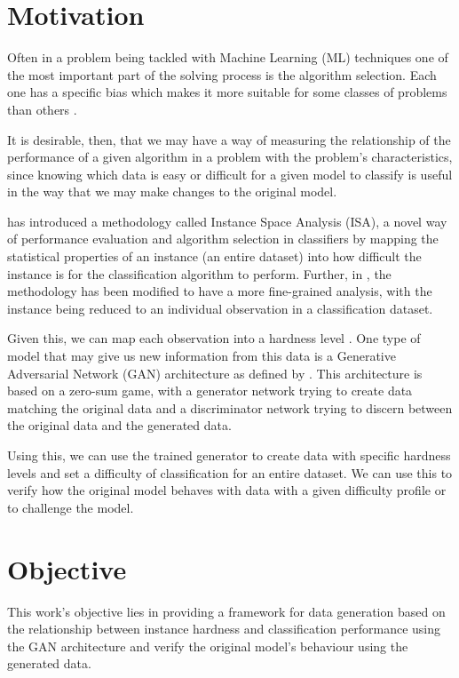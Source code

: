 \section{Motivation}
Often in a problem being tackled with Machine Learning (ML) techniques one of the most important part of the solving process is the algorithm selection. Each one has a specific bias which makes it more suitable for some classes of problems than others \cite{Lorena2022}. 

It is desirable, then, that we may have a way of measuring the relationship of the performance of a given algorithm in a problem with the problem's characteristics, since knowing which data is easy or difficult for a given model to classify is useful in the way that we may make changes to the original model.

\cite{Munoz2018} has introduced a methodology called Instance Space Analysis (ISA), a novel way of performance evaluation and algorithm selection in classifiers by mapping the statistical properties of an instance (an entire dataset) into how difficult the instance is for the classification algorithm to perform. Further, in \cite{Lorena2022}, the methodology has been modified to have a more fine-grained analysis, with the instance being reduced to an individual observation in a classification dataset.

Given this, we can map each observation into a hardness level . One type of model that may give us new information from this data is a Generative Adversarial Network (GAN) architecture as defined by \cite{Goodfellow2014}. This architecture is based on a zero-sum game, with a generator network trying to create data matching the original data and a discriminator network trying to discern between the original data and the generated data. 

Using this, we can use the trained generator to create data with specific hardness levels and set a difficulty of classification for an entire dataset. We can use this to verify how the original model behaves with data with a given difficulty profile or to challenge the model.

\section{Objective}

This work's objective lies in providing a framework for data generation based on the relationship between instance hardness and classification performance using the GAN architecture and verify the original model's behaviour using the generated data. 

